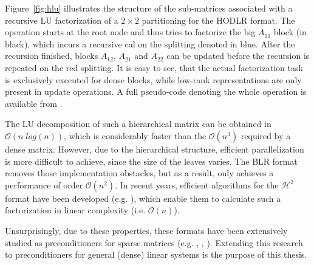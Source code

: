 Figure~\hyperref[fig:hlu]{\ref{fig:hlu}} illustrates the structure of the sub-matrices associated with a recursive LU factorization of a $2 \times 2$ partitioning for the HODLR format. The operation starts at the root node and thus tries to factorize the big $A_{11}$  block (in black), which incurs a recursive cal on the splitting denoted in blue. After the recursion finished, blocks $A_{12}$, $A_{21}$ and $A_{22}$ can be updated before the recursion is repeated on the red splitting. It is easy to see, that the actual factorization task is exclusively executed for dense blocks, while low-rank representations are only present in update operations. A full pseudo-code denoting the whole operation is available from \cite{hackbusch_hierarchical_2015}.

The LU decomposition of such a hierarchical matrix can be obtained in $\mathcal{O}(n\;log(n))$, which is considerably faster than the $\mathcal{O}(n^3)$ required by a dense matrix. However, due to the hierarchical structure, efficient parallelization is more difficult to achieve, since the size of the leaves varies. The BLR format removes those implementation obstacles, but as a result, only achieves a performance of order $\mathcal{O}(n^2)$. In recent years, efficient algorithms for the $\mathcal{H}^2$ format have been developed (e.g. \cite{ma_accuracy_2018}), which enable them to calculate such a factorization in linear complexity (i.e. $\mathcal{O}(n)$). 

Unsurprisingly, due to these properties, these formats have been extensively studied as preconditioners for sparse matrices (e.g. \cite{bebendorf_hierarchical_2008}, \cite{xia_fast_2010}, \cite{gatto_preconditioner_2015}). Extending this research to preconditioners for general (dense) linear systems is the purpose of this thesis.